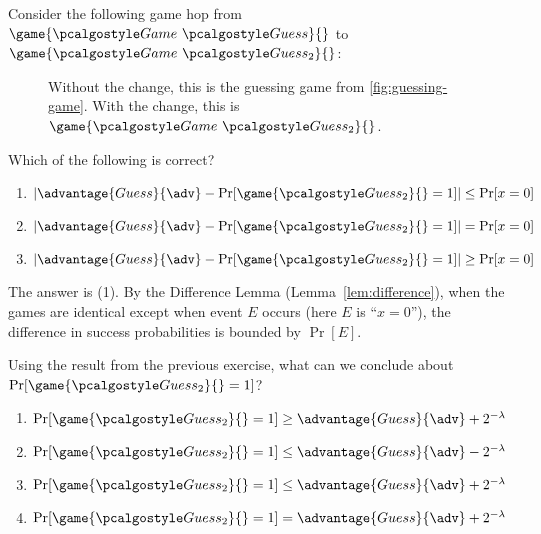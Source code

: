 \begin{exercise}
  Consider the following game hop from $\game{\Game~\algo{Guess}}{}$ to $\game{\Game~\algo{Guess}_2}{}$:
  
  \begin{figure}[h!]
    \begin{center}
      \begin{tcolorbox}[width=3cm]
        \begin{pchstack}[center]
        \end{pchstack}
      \end{tcolorbox}
    \end{center}
    \caption{Without the  change, this is the guessing game from \autoref{fig:guessing-game}. With the change, this is $\game{\Game~\algo{Guess}_2}{}$.}
  \end{figure}
  
  Which of the following is correct?
  \begin{enumerate}
    \item $|\advantage{Guess}{\adv} - \Pr[\game{\algo{Guess}_2}{} = 1]| \leq \Pr[x = 0]$
    \item $|\advantage{Guess}{\adv} - \Pr[\game{\algo{Guess}_2}{} = 1]| = \Pr[x = 0]$
    \item $|\advantage{Guess}{\adv} - \Pr[\game{\algo{Guess}_2}{} = 1]| \geq \Pr[x = 0]$
  \end{enumerate}
\end{exercise}

\ifsolutions
\begin{mysolution}
  The answer is (1).
  By the Difference Lemma (Lemma~\ref{lem:difference}), when the games are identical except when event $E$ occurs (here $E$ is ``$x = 0$''), the difference in success probabilities is bounded by $\Pr[E]$.
\end{mysolution}
\fi

\begin{exercise}
  Using the result from the previous exercise, what can we conclude about $\Pr[\game{\algo{Guess}_2}{} = 1]$?
  \begin{enumerate}
    \item $\Pr[\game{\algo{Guess}_2}{} = 1] \geq \advantage{Guess}{\adv} + 2^{-\lambda}$
    \item $\Pr[\game{\algo{Guess}_2}{} = 1] \leq \advantage{Guess}{\adv} - 2^{-\lambda}$
    \item $\Pr[\game{\algo{Guess}_2}{} = 1] \leq \advantage{Guess}{\adv} + 2^{-\lambda}$
    \item $\Pr[\game{\algo{Guess}_2}{} = 1] = \advantage{Guess}{\adv} + 2^{-\lambda}$
  \end{enumerate}
\end{exercise}


